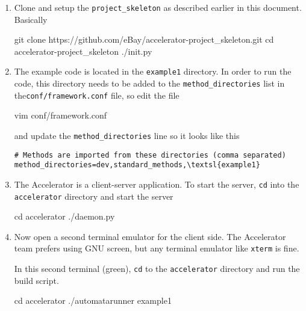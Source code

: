 \documentclass[a4paper]{article}
\begin{document}
\begin{enumerate}
\item Clone and setup the \texttt{project\_skeleton} as described
  earlier in this document.  Basically
\begin{shell}
git clone https://github.com/eBay/accelerator-project_skeleton.git
cd accelerator-project_skeleton
./init.py
\end{shell}

\item The example code is located in the \texttt{example1} directory.
  In order to run the code, this directory needs to be added to the
  \texttt{method\_directories} list in the\texttt{conf/framework.conf}
  file, so edit the file
  \begin{shell}
vim conf/framework.conf
  \end{shell}
  and update the \texttt{method\_directories} line so it looks like this
  \begin{Verbatim}[commandchars=\\\{\}]
# Methods are imported from these directories (comma separated)
method_directories=dev,standard_methods,\textsl{example1}
  \end{Verbatim}

\item The Accelerator is a client-server application.  To start the
  server, \texttt{cd} into the \texttt{accelerator} directory and
  start the server
  \begin{shell}
cd accelerator
./daemon.py
  \end{shell}

\item Now open a second terminal emulator for the client side.  The
  Accelerator team prefers using GNU screen, but any terminal emulator
  like \texttt{xterm} is fine.

  In this second terminal (green), \texttt{cd} to the
  \texttt{accelerator} directory and run the build script.
  \begin{shell2}
cd accelerator
./automatarunner example1
  \end{shell2}
\end{enumerate}
\end{document}
